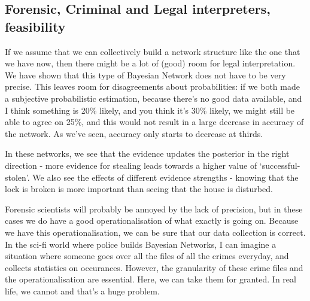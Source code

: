\subsection{Forensic, Criminal and Legal interpreters, feasibility}
If we assume that we can collectively build a network structure like the one that we have now, then there might be a lot of (good) room for legal interpretation. We have shown that this type of Bayesian Network does not have to be very precise. This leaves room for disagreements about probabilities: if we both made a subjective probabilistic estimation, because there's no good data available, and I think something is 20\% likely, and you think it's 30\% likely, we might still be able to agree on 25\%, and this would not result in a large decrease in accuracy of the network. As we've seen, accuracy only starts to decrease at thirds.

In these networks, we see that the evidence updates the posterior in the right direction - more evidence for stealing leads towards a higher value of `successful-stolen'. We also see the effects of different evidence strengths - knowing that the lock is broken is more important than seeing that the house is disturbed.

Forensic scientists will probably be annoyed by the lack of precision, but in these cases we do have a good operationalisation of what exactly is going on. Because we have this operationalisation, we can be sure that our data collection is correct. In the sci-fi world where police builds Bayesian Networks, I can imagine a situation where someone goes over all the files of all the crimes everyday, and collects statistics on occurances. However, the granularity of these crime files and the operationalisation are essential. Here, we can take them for granted. In real life, we cannot and that's a huge problem. 





